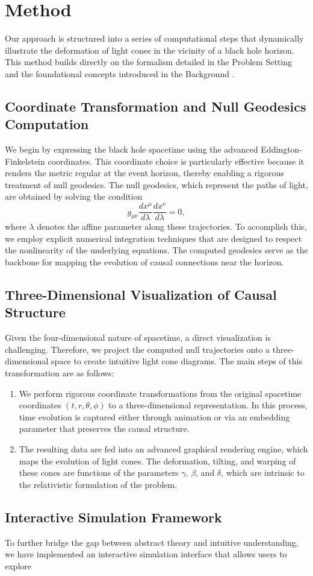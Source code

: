 \documentclass{article}
\begin{document}
\section{Method}  Our approach is structured into a series of computational steps that dynamically illustrate the deformation of light cones in the vicinity of a black hole horizon. This method builds directly on the formalism detailed in the Problem Setting and the foundational concepts introduced in the Background \cite{Reference1,Reference2,Reference3,Reference4}.  \subsection{Coordinate Transformation and Null Geodesics Computation}  We begin by expressing the black hole spacetime using the advanced Eddington-Finkelstein coordinates. This coordinate choice is particularly effective because it renders the metric regular at the event horizon, thereby enabling a rigorous treatment of null geodesics. The null geodesics, which represent the paths of light, are obtained by solving the condition \begin{equation}   g_{\mu\nu}\frac{dx^\mu}{d\lambda}\frac{dx^\nu}{d\lambda} = 0,  \end{equation} where $\lambda$ denotes the affine parameter along these trajectories. To accomplish this, we employ explicit numerical integration techniques that are designed to respect the nonlinearity of the underlying equations. The computed geodesics serve as the backbone for mapping the evolution of causal connections near the horizon.  \subsection{Three-Dimensional Visualization of Causal Structure}  Given the four-dimensional nature of spacetime, a direct visualization is challenging. Therefore, we project the computed null trajectories onto a three-dimensional space to create intuitive light cone diagrams. The main steps of this transformation are as follows: \begin{enumerate}   \item We perform rigorous coordinate transformations from the original spacetime coordinates $(t,r,\theta,\phi)$ to a three-dimensional representation. In this process, time evolution is captured either through animation or via an embedding parameter that preserves the causal structure.   \item The resulting data are fed into an advanced graphical rendering engine, which maps the evolution of light cones. The deformation, tilting, and warping of these cones are functions of the parameters $\gamma$, $\beta$, and $\delta$, which are intrinsic to the relativistic formulation of the problem. \end{enumerate}  \subsection{Interactive Simulation Framework}  To further bridge the gap between abstract theory and intuitive understanding, we have implemented an interactive simulation interface that allows users to explore 
\end{document}
